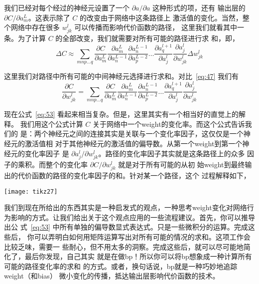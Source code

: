 我们已经对每个经过的神经元设置了一个 $\partial a/\partial a$ 这种形式的项，还有
输出层的 $\partial C/\partial a_m^L$。这表示除了 $C$ 的改变由于网络中这条路径上
激活值的变化。当然，整个网络中存在很多 $w_{jk}^l$ 可以传播而影响代价函数的路径，
这里我们就看其中一条。为了计算 $C$ 的全部改变，我们就需要对所有可能的路径进行求
和，即，
\begin{equation}
  \Delta C \approx \sum_{mnp\ldots q} \frac{\partial C}{\partial a^L_m}
  \frac{\partial a^L_m}{\partial a^{L-1}_n} \frac{\partial a^{L-1}_n}{\partial
    a^{L-2}_p} \ldots \frac{\partial a^{l+1}_q}{\partial a^l_j} \frac{\partial
    a^l_j}{\partial w^l_{jk}} \Delta w^l_{jk}
  \label{eq:52}\tag{52}
\end{equation}

这里我们对路径中所有可能的中间神经元选择进行求和。对比~\eqref{eq:47} 我们有
\begin{equation}
  \frac{\partial C}{\partial w^l_{jk}} = \sum_{mnp\ldots q} \frac{\partial
    C}{\partial a^L_m} \frac{\partial a^L_m}{\partial a^{L-1}_n} \frac{\partial
    a^{L-1}_n}{\partial a^{L-2}_p} \ldots \frac{\partial a^{l+1}_q}{\partial
    a^l_j} \frac{\partial a^l_j}{\partial w^l_{jk}}
\label{eq:53}\tag{53}
\end{equation}

现在公式~\eqref{eq:53} 看起来相当复杂。但是，这里其实有一个相当好的直觉上的解释。
我们用这个公式计算 $C$ 关于网络中一个\gls*{weight}的变化率。而这个公式告诉我们的
是：两个神经元之间的连接其实是关联与一个变化率因子，这仅仅是一个神经元的激活值相
对于其他神经元的激活值的偏导数。从第一个\gls*{weight}到第一个神经元的变化率因子
是 $\partial a_j^l/\partial w_{jk}^l$。路径的变化率因子其实就是这条路径上的众多
因子的乘积。而整个的变化率 $\partial C/\partial w_{jk}^l$ 就是对于所有可能的从初
始\gls*{weight}到最终输出的代价函数的路径的变化率因子的和。针对某一个路径，这个
过程解释如下，

\begin{center}
  \texttt{[image: tikz27]}
\end{center}

我们到现在所给出的东西其实是一种启发式的观点，一种思考\gls*{weight}变化对网络行
为影响的方式。让我们给出关于这个观点应用的一些流程建议。首先，你可以推导出公
式~\eqref{eq:53} 中所有单独的偏导数显式表达式。只是一些微积分的运算。完成这些后，
你可以弄明白如何用矩阵运算写出对所有可能的情况的求和。这项工作会比较乏味，需要一
些耐心，但不用太多的洞察。完成这些后，就可以尽可能地简化了，最后你发现，自己其实
就是在做\gls*{bp}！所以你可以将\gls*{bp}想象成一种计算所有可能的路径变化率的求和
的方式。或者，换句话说，\gls*{bp}就是一种巧妙地追踪\gls*{weight}（和\gls*{bias}）
微小变化的传播，抵达输出层影响代价函数的技术。

